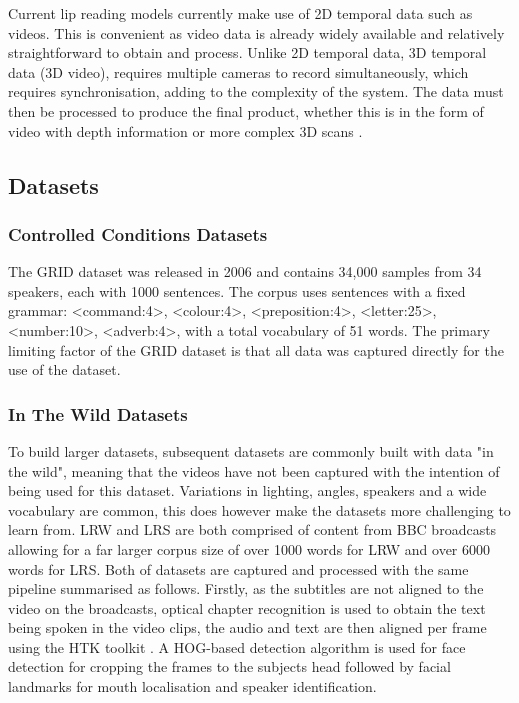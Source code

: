 \documentclass[12pt]{article}
\begin{document}
Current lip reading models currently make use of 2D temporal data such as videos.
This is convenient as video data is already widely available and relatively straightforward to obtain and process.
Unlike 2D temporal data, 3D temporal data (3D video), requires multiple cameras to record simultaneously, which requires synchronisation, adding to the complexity of the system.
The data must then be processed to produce the final product, whether this is in the form of video with depth information or more complex 3D scans \cite{Li2017}.

\subsection{Datasets}

\subsubsection{Controlled Conditions Datasets}
The GRID dataset was released in 2006 \cite{Cooke2006} and contains 34,000 samples from 34 speakers, each with 1000 sentences.
The corpus uses sentences with a fixed grammar: 
<command:4>, <colour:4>, <preposition:4>, <letter:25>, <number:10>, <adverb:4>, with a total vocabulary of 51 words.
The primary limiting factor of the GRID dataset is that all data was captured directly for the use of the dataset.

\subsubsection{In The Wild Datasets}
To build larger datasets, subsequent datasets are commonly built with data "in the wild", meaning that the videos have not been captured with the intention of being used for this dataset.
Variations in lighting, angles, speakers and a wide vocabulary are common, this does however make the datasets more challenging to learn from.
LRW and LRS are both comprised of content from BBC broadcasts \cite{Chung2016, Chung2017} allowing for a far larger corpus size of over 1000 words for LRW and over 6000 words for LRS.
Both of datasets are captured and processed with the same pipeline summarised as follows. 
Firstly, as the subtitles are not aligned to the video on the broadcasts, optical chapter recognition is used to obtain the text being spoken in the video clips, the audio and text are then aligned per frame using the HTK toolkit \cite{Woodland1995}. 
A HOG-based detection algorithm \cite{King2009} is used for face detection for cropping the frames to the subjects head followed by facial landmarks for mouth localisation and speaker identification. 
\end{document}
